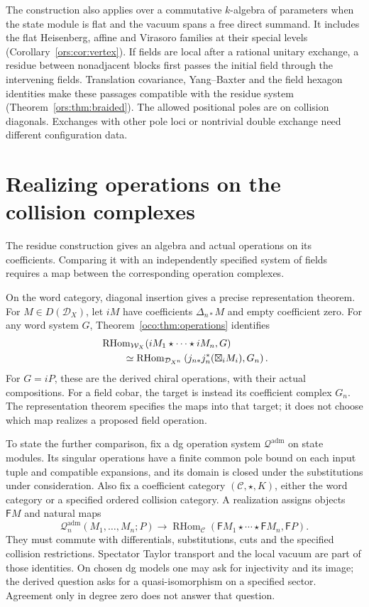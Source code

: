 The construction also applies over a commutative
\(k\)-algebra of parameters when the state module is flat
and the vacuum spans a free direct summand. It includes
the flat Heisenberg, affine and Virasoro families at their
special levels (Corollary~\ref{ors:cor:vertex}). If fields
are local after a rational unitary exchange, a residue
between nonadjacent blocks first passes the initial field
through the intervening fields. Translation covariance,
Yang--Baxter and the field hexagon identities make these
passages compatible with the residue system
(Theorem~\ref{ors:thm:braided}). The allowed positional
poles are on collision diagonals. Exchanges with other
pole loci or nontrivial double exchange need different
configuration data.

\section{Realizing operations on the collision complexes}

The residue construction gives an algebra and actual
operations on its coefficients. Comparing it with an
independently specified system of fields requires a map
between the corresponding operation complexes.

On\label{e1f:def:diagonal-operation-insertion} the word category, diagonal insertion gives a precise
representation theorem. For \(M\in D(\mathcal D_X)\),
let \(iM\) have coefficients \(\Delta_{n*}M\) and empty
coefficient zero. For any word system \(G\),
Theorem~\ref{oco:thm:operations} identifies
\[
 \begin{aligned}
 &\operatorname{RHom}_{\mathcal W_X}
       (iM_1\star\cdots\star iM_n,G)\\
 &\hspace{8mm}\simeq
 \operatorname{RHom}_{\mathcal D_{X^n}}
       \left(j_{n*}j_n^*(\boxtimes_iM_i),G_n\right).
 \end{aligned}
\]
For \(G=iP\), these are the derived chiral operations,
with their actual compositions. For a field cobar, the
target is instead its coefficient complex \(G_n\).
The representation theorem specifies the maps into that
target; it does not choose which map realizes a proposed
field operation.

To state the further comparison, fix a dg operation system
\(\mathcal Q^{\mathrm{adm}}\) on state modules. Its
singular operations have a finite common pole bound on
each input tuple and compatible expansions, and its domain
is closed under the substitutions under consideration.
Also fix a coefficient category \((\mathcal C,\star,K)\),
either the word category or a specified ordered collision
category. A realization assigns objects \(\mathsf FM\)
and natural maps
\[
 \mathcal Q_n^{\mathrm{adm}}(M_1,\ldots,M_n;P)
 \longrightarrow
 \operatorname{RHom}_{\mathcal C}
       (\mathsf FM_1\star\cdots\star\mathsf FM_n,\mathsf FP).
\]
They must commute with differentials, substitutions, cuts
and the specified collision restrictions. Spectator Taylor
transport and the local vacuum are part of those identities.
On chosen dg models one may ask for injectivity and its
image; the derived question asks for a quasi-isomorphism on
a specified sector. Agreement only in degree zero does not
answer that question.

